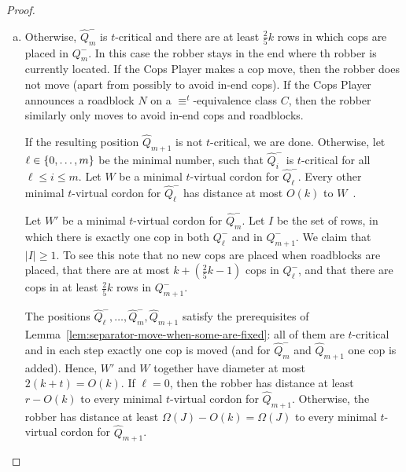 \documentclass[a4paper,english, thm-restate]{lipics-v2021}
\DeclarePairedDelimiter\set{\lbrace}{\rbrace}
\newcommand{\comp}{\equiv}
\begin{document}
\begin{proof}
\begin{claimproof}
\begin{enumerate}[(a)]
			
			
			\item Otherwise, $\hat{Q}_m^-$ is $t$-critical and there are at least $\frac{2}{5}k$ rows in which cops are placed in $Q_m^-$. In this case the robber stays in the end where th robber is currently located.
			If the Cops Player makes a cop move,
			then the robber does not move (apart from possibly to avoid in-end cops).
			If the Cops Player announces a roadblock $N$ on a $\comp^t$\nobreakdash-equivalence class $C$, then the robber similarly only moves to avoid in-end cops and roadblocks.
			
			If the resulting position $\hat{Q}_{m+1}$ is not $t$-critical, we are done.
			Otherwise, let $\ell \in \set{0,\dots,m}$ be the minimal number, such that $\hat{Q}_i^-$
			is $t$-critical for all $\ell\leq i \leq m$.
			Let $W$ be a minimal $t$-virtual cordon for $\hat{Q}_\ell^-$.
			Every other minimal  $t$-virtual cordon for $\hat{Q}_\ell^-$
			has distance at most $O(k)$ to $W$~\cite{RFJN024}.
			
			Let $W'$ be a  minimal $t$-virtual cordon for $\hat{Q}_m^-$.
			Let $I$ be the set of rows,
			in which there is exactly one cop in both $Q_\ell^-$ and in $Q_{m+1}^-$.
			We claim that $|I|\geq 1$. To see this note that
			no new cops are placed when roadblocks are placed,
			that there are at most $k + (\frac{2}{5}k-1)$ cops in $Q_\ell^-$,
			and that there are cops in at least $\frac{2}{5}k$ rows in $Q_{m+1}^-$.
			
			
			The positions $\hat{Q}_\ell^-, \dots, \hat{Q}_m^-, \hat{Q}_{m+1}$ satisfy the prerequisites of Lemma~\ref{lem:separator-move-when-some-are-fixed}:
			all of them are $t$-critical and in each step exactly one cop is moved (and for $\hat{Q}_m^-$ and $\hat{Q}_{m+1}$ one cop is added).
			Hence, $W'$ and $W$ together have diameter at most $2(k+t) = O(k)$.
			If $\ell = 0$, then the robber has distance at least $r-O(k)$
			to every minimal $t$-virtual cordon for $\hat{Q}_{m+1}$.
			Otherwise, the robber has distance at least $\Omega(J) - O(k) = \Omega(J)$
			to every minimal $t$-virtual cordon for $\hat{Q}_{m+1}$.
			\claimqedhere
		\end{enumerate}
		
	\end{claimproof}
	

\end{proof}
\end{document}
